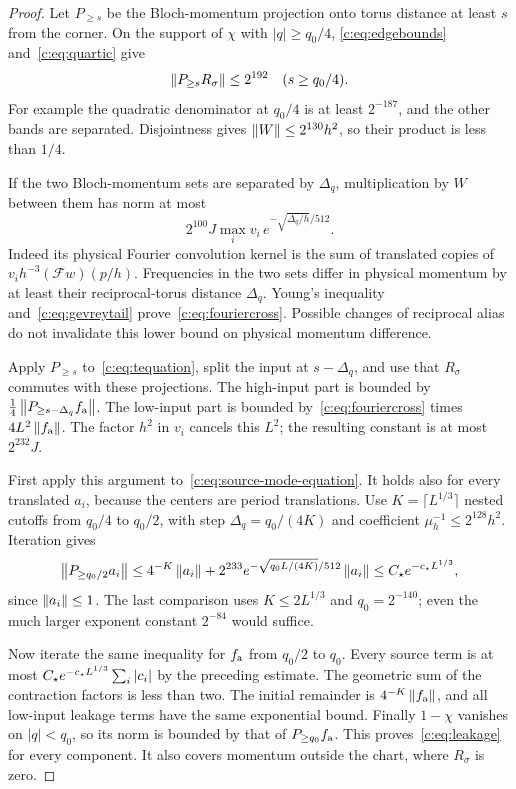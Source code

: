 \begin{proof}
Let $P_{\ge s}$ be the Bloch-momentum projection onto torus distance at least
$s$ from the corner. On the support of $\chi$ with $|q|\ge q_0/4$,
\eqref{c:eq:edgebounds} and~\eqref{c:eq:quartic} give
\begin{equation}
 \left\lVert P_{\ge s}R_\sigma\right\rVert\le2^{192}\quad(s\ge q_0/4).
                                                               \label{c:eq:highqbound}
\end{equation}
For example the quadratic denominator at $q_0/4$ is at least
$2^{-187}$, and the other bands are separated. Disjointness gives
$\left\lVert W\right\rVert\le2^{130}h^2$, so their product is less than $1/4$.

If the two Bloch-momentum sets are separated by $\Delta_q$, multiplication
by $W$ between them has norm at most
\begin{equation}
 2^{100}J\max_i v_i\,e^{-\sqrt{\Delta_q/h}/512}.         \label{c:eq:fouriercross}
\end{equation}
Indeed its physical Fourier convolution kernel is the sum of translated
copies of $v_ih^{-3}(\mathcal Fw)(p/h)$. Frequencies in the two sets
differ in physical momentum by at least their reciprocal-torus
distance $\Delta_q$. Young's inequality and~\eqref{c:eq:gevreytail}
prove~\eqref{c:eq:fouriercross}. Possible changes of reciprocal alias
do not invalidate this lower bound on physical momentum difference.

Apply $P_{\ge s}$ to~\eqref{c:eq:tequation}, split the input at $s-\Delta_q$,
and use that $R_\sigma$ commutes with these projections. The high-input
part is bounded by $\tfrac14\left\lVert P_{\ge s-\Delta_q}f_{\rm a}\right\rVert$. The low-input
part is bounded by~\eqref{c:eq:fouriercross} times $4L^2\left\lVert f_{\rm a}\right\rVert$.
The factor $h^2$ in $v_i$ cancels this $L^2$; the resulting constant
is at most $2^{232}J$.

First apply this argument to~\eqref{c:eq:source-mode-equation}. It holds
also for every translated $a_i$, because the centers are period
translations. Use $K=\lceil L^{1/3}\rceil$ nested cutoffs from
$q_0/4$ to $q_0/2$, with step $\Delta_q=q_0/(4K)$ and coefficient
$\mu_h^{-1}\le2^{128}h^2$. Iteration gives
\[
 \left\lVert P_{\ge q_0/2}a_i\right\rVert\le
 4^{-K}\left\lVert a_i\right\rVert+
 2^{233}e^{-\sqrt{q_0L/(4K)}/512}\left\lVert a_i\right\rVert
 \le C_\star e^{-c_\star L^{1/3}},
\]
since $\left\lVert a_i\right\rVert\le1$. The last comparison uses
$K\le2L^{1/3}$ and $q_0=2^{-140}$; even the much larger exponent
constant $2^{-84}$ would suffice.

Now iterate the same inequality for $f_{\rm a}$ from $q_0/2$ to $q_0$.
Every source term is at most
$C_\star e^{-c_\star L^{1/3}}\sum_i|c_i|$ by the preceding estimate.
The geometric sum of the contraction factors is less than two.
The initial remainder is $4^{-K}\left\lVert f_{\rm a}\right\rVert$, and all low-input leakage
terms have the same exponential bound. Finally $1-\chi$ vanishes on
$|q|<q_0$, so its norm is bounded by that of $P_{\ge q_0}f_{\rm a}$.
This proves~\eqref{c:eq:leakage} for every component. It also covers
momentum outside the chart, where $R_\sigma$ is zero.
\end{proof}

